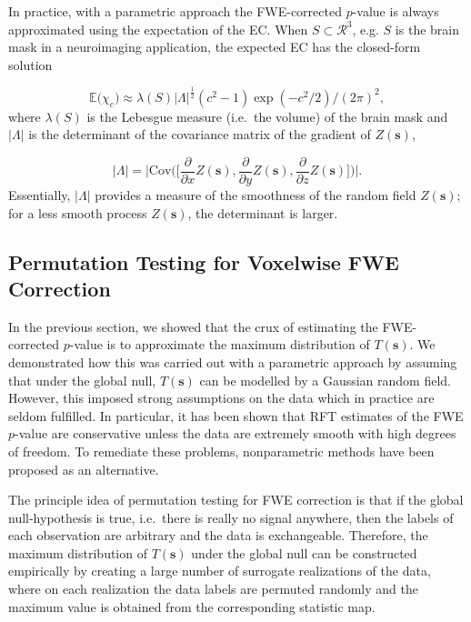In practice, with a parametric approach the FWE-corrected $p$-value is always approximated using the expectation of the EC. When $S \subset \mathcal{R}^{3}$,  e.g. $S$ is the brain mask in a neuroimaging application, the expected EC has the closed-form solution 

\begin{equation}
\label{eq:EC_closed_form_approx}
\mathbb{E}\Big(\chi_{c} \Big) \approx \lambda(S)|\Lambda|^{\frac{1}{2}}(c^{2} - 1)\exp{(- c^{2}/2)}/(2\pi)^{2},
\end{equation}
where $\lambda(S)$ is the Lebesgue measure (i.e.\ the volume) of the brain mask and $|\Lambda|$ is the determinant of the covariance matrix of the gradient of $Z(\bm{s})$,

\begin{equation}
\label{Lamda_determinant}
|\Lambda| = \Bigg|\mathrm{Cov}\bigg(\bigg[\frac{\partial}{\partial x}Z(\bm{s}), \frac{\partial}{\partial y}Z(\bm{s}), \frac{\partial}{\partial z}Z(\bm{s})\bigg]\bigg)\Bigg|.
\end{equation}
Essentially, $|\Lambda|$ provides a measure of the smoothness of the random field $Z(\bm{s})$; for a less smooth process $Z(\bm{s})$, the determinant is  larger. 


\subsection{Permutation Testing for Voxelwise FWE Correction}

In the previous section, we showed that the crux of estimating the FWE-corrected $p$-value is to approximate the maximum distribution of $T(\bm{s})$. We demonstrated how this was carried out with a parametric approach by assuming that under the global null, $T(\bm{s})$ can be modelled by a Gaussian random field. However, this imposed strong assumptions on the data which in practice are seldom fulfilled. In particular, it has been shown that RFT estimates of the FWE $p$-value are conservative unless the data are extremely smooth with high degrees of freedom. To remediate these problems, nonparametric methods have been proposed as an alternative.

The principle idea of permutation testing for FWE correction is that if the global null-hypothesis is true, i.e.\ there is really no signal anywhere, then the labels of each observation are arbitrary and the data is exchangeable. Therefore, the maximum distribution of $T(\bm{s})$ under the global null can be constructed empirically by creating a large number of surrogate realizations of the data, where on each realization the data labels are permuted randomly and the maximum value is obtained from the corresponding statistic map. 

